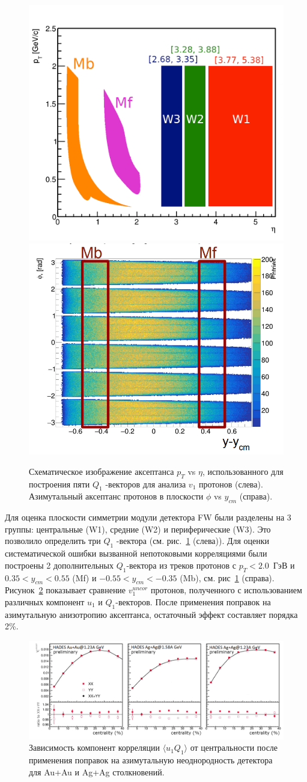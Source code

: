 \begin{figure}[h]
\begin{center}
  \includegraphics[width=0.4\linewidth]{images/eta_pt_qvectors.png}
   \includegraphics[width=0.4\linewidth]{images/hades_phi_rapidity.png}
   \caption{ Схематическое изображение аксептанса $p_T$ vs $\eta$, использованного для построения пяти  $Q_1$ -векторов для анализа $v_1$ протонов (слева).
   Азимутальный аксептанс  протонов в плоскости $\phi$  vs $y_{cm}$ (справа). }
\label{fig:hades_qvectors}
\end{center}
\end{figure}
%
Для оценка плоскости симметрии модули детектора FW были разделены на 3 группы: центральные (W1), средние (W2) и периферические (W3). Это позволило определить три $Q_1$ -вектора (см. 
рис.~\ref{fig:hades_qvectors} (слева)). 
Для оценки систематической ошибки вызванной непотоковыми корреляциями были построены 2 дополнительных $Q_1$-вектора из треков протонов с 
$p_T < 2.0$~ГэВ и  $0.35 < y_{cm} < 0.55$ (Mf) и $-0.55 < y_{cm} < -0.35$ (Mb), см. рис~\ref{fig:hades_qvectors} (справа).\\
Рисунок~\ref{fig:hades_uq_corr} показывает сравнение $v_1^{uncor}$ протонов, полученного с использованием различных компонент $u_1$ и $Q_1$-векторов. 
После применения поправок на азимутальную анизотропию аксептанса, остаточный эффект составляет порядка 2\%.\\
%
\begin{figure}[h]
\begin{center}
\includegraphics[width=0.75\linewidth]{images/hades_u1W1_centrality.png}
\caption{Зависимость компонент корреляции $\langle u_1 Q_1 \rangle$ от центральности после применения поправок на азимутальную неоднородность детектора
 для  Au+Au и Ag+Ag столкновений.}
\label{fig:hades_uq_corr}
\end{center}
\end{figure}


